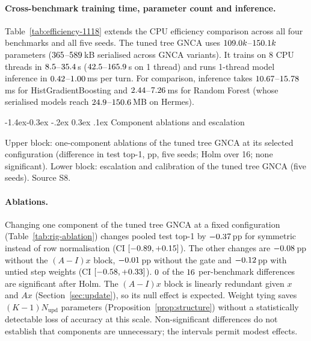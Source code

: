 \documentclass[10pt,twocolumn,letterpaper]{article}
\makeatletter
\renewcommand\subsection{\@startsection{subsection}{2}{\z@}%
  {-1.4ex\@plus -0.3ex \@minus -.2ex}%
  {0.3ex \@plus .1ex}%
  {\normalfont\normalsize\bfseries}}
\makeatother
\begin{document}
\paragraph{Cross-benchmark training time, parameter count and inference.} Table~\ref{tab:efficiency-1118} extends the CPU efficiency comparison across all four benchmarks and all five seeds. The tuned tree GNCA uses $109.0k$--$150.1k$ parameters ($365$--$589$\,kB serialised across GNCA variants). It trains on 8 CPU threads in $8.5$--$35.4$\,s ($42.5$--$165.9$\,s on 1 thread) and runs 1-thread model inference in $0.42$--$1.00$\,ms per turn. For comparison, inference takes $10.67$--$15.78$\,ms for HistGradientBoosting and $2.44$--$7.26$\,ms for Random Forest (whose serialised models reach $24.9$--$150.6$\,MB on Hermes).

\subsection{Component ablations and escalation}\label{sec:ablation}
\begin{table}[t]
\centering
\scriptsize
\setlength{\tabcolsep}{8pt}
\caption{Upper block: one-component ablations of the tuned tree GNCA at its selected configuration (difference in test top-1, pp, five seeds; Holm over 16; none significant). Lower block: escalation and calibration of the tuned tree GNCA (five seeds). Source S8.}
\label{tab:rig-ablation}

\end{table}

\paragraph{Ablations.} Changing one component of the tuned tree GNCA at a fixed configuration (Table~\ref{tab:rig-ablation}) changes pooled test top-1 by $-0.37$\,pp for symmetric instead of row normalisation (CI $[-0.89, +0.15]$). The other changes are $-0.08$\,pp without the $(A{-}I)x$ block, $-0.01$\,pp without the gate and $-0.12$\,pp with untied step weights (CI $[-0.58, +0.33]$). $0$ of the $16$ per-benchmark differences are significant after Holm. The $(A{-}I)x$ block is linearly redundant given $x$ and $Ax$ (Section~\ref{sec:update}), so its null effect is expected. Weight tying saves $(K{-}1)N_{\text{upd}}$ parameters (Proposition~\ref{prop:structure}) without a statistically detectable loss of accuracy at this scale. Non-significant differences do not establish that components are unnecessary; the intervals permit modest effects.
\end{document}
